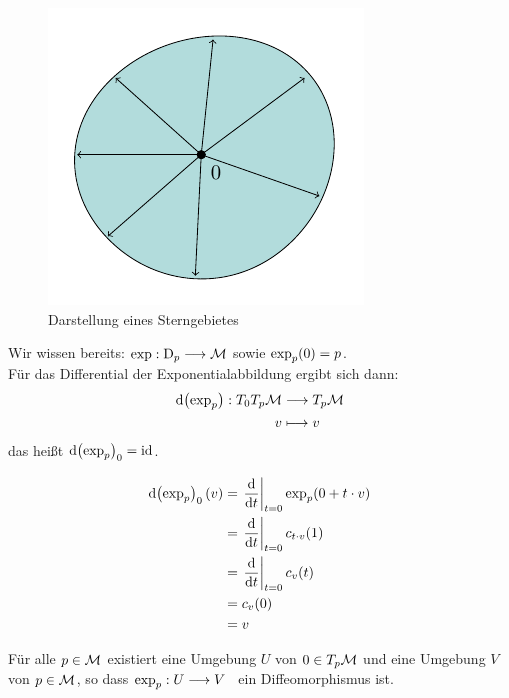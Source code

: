 \begin{figure}[H]
\centering
\includegraphics[scale=0.8]{figures/tikz/star_domain.pdf}
\caption{Darstellung eines Sterngebietes}
\end{figure}
\begin{lem}
Wir wissen bereits: $\operatorname{exp}: \mathrm{D}_p  \longrightarrow \mathcal{M}$ sowie $\operatorname{exp}_p(0) = p $. \\
Für das Differential der Exponentialabbildung ergibt sich dann:
\begin{align*}
\dd(\operatorname{exp}_p): T_0T_p\mathcal{M} &\longrightarrow T_p\mathcal{M} \\
v &\longmapsto v
\end{align*}
das heißt $\dd(\operatorname{exp}_p)_0=\operatorname{id}$.
\end{lem}
\begin{bew}
\begin{align*}
\dd(\expp_p)_0(v) &= \eval{\frac{\dd}{\dd t}}_{t=0} \expp_p(0+t\cdot v)  \\
&= \eval{\frac{\dd}{\dd t}}_{t=0}c_{t\cdot v}(1) \\
&= \eval{\frac{\dd}{\dd t}}_{t=0}c_v(t) \\
&= c_v(0) \\
&=v
\end{align*}
\end{bew}

\begin{kor}
Für alle $p \in \mathcal{M}$ existiert eine Umgebung $U$ von $0 \in T_p\mathcal{M}$ und eine Umgebung $V$ von $p \in \mathcal{M}$, so dass $\operatorname{exp}_p: U \longrightarrow V$ \ ein Diffeomorphismus ist.
\end{kor}

